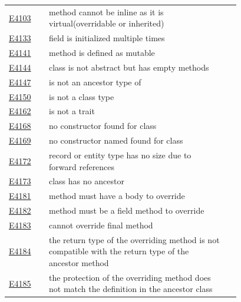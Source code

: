 \begin{longtable}{@{}l p{0.78\linewidth} r@{}}
\hyperref[sec:codes:e4103]{E4103} & method \errhole{} cannot be inline as it is virtual(overridable or inherited) & \pageref{sec:codes:e4103}\\
\hyperref[sec:codes:e4133]{E4133} & field \errhole{} is initialized multiple times & \pageref{sec:codes:e4133}\\
\hyperref[sec:codes:e4141]{E4141} & method \errhole{} is defined as mutable & \pageref{sec:codes:e4141}\\
\hyperref[sec:codes:e4144]{E4144} & class \errhole{} is not abstract but has empty methods & \pageref{sec:codes:e4144}\\
\hyperref[sec:codes:e4147]{E4147} & \errhole{} is not an ancestor type of \errhole{} & \pageref{sec:codes:e4147}\\
\hyperref[sec:codes:e4150]{E4150} & \errhole{} is not a class type & \pageref{sec:codes:e4150}\\
\hyperref[sec:codes:e4162]{E4162} & \errhole{} is not a trait & \pageref{sec:codes:e4162}\\
\hyperref[sec:codes:e4168]{E4168} & no constructor found for class \errhole{} & \pageref{sec:codes:e4168}\\
\hyperref[sec:codes:e4169]{E4169} & no constructor named \errhole{} found for class \errhole{} & \pageref{sec:codes:e4169}\\
\hyperref[sec:codes:e4172]{E4172} & record or entity type \errhole{} has no size due to forward references & \pageref{sec:codes:e4172}\\
\hyperref[sec:codes:e4173]{E4173} & class \errhole{} has no ancestor & \pageref{sec:codes:e4173}\\
\hyperref[sec:codes:e4181]{E4181} & method \errhole{} must have a body to override \errhole{} & \pageref{sec:codes:e4181}\\
\hyperref[sec:codes:e4182]{E4182} & method \errhole{} must be a field method to override \errhole{} & \pageref{sec:codes:e4182}\\
\hyperref[sec:codes:e4183]{E4183} & cannot override final method \errhole{} & \pageref{sec:codes:e4183}\\
\hyperref[sec:codes:e4184]{E4184} & the return type of the overriding method \errhole{} is not compatible with the return type of the ancestor method \errhole{} & \pageref{sec:codes:e4184}\\
\hyperref[sec:codes:e4185]{E4185} & the protection \errhole{} of the overriding method \errhole{} does not match the definition in the ancestor class \errhole{} & \pageref{sec:codes:e4185}\\

\end{longtable}

